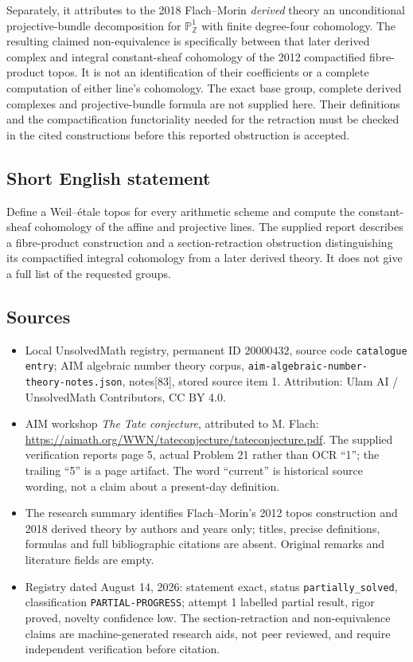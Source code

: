 \documentclass[11pt]{article}
\newcommand{\Z}{\mathbb{Z}}
\newcommand{\PP}{\mathbb{P}}
\begin{document}
Separately, it attributes to the 2018 Flach--Morin \emph{derived} theory an unconditional projective-bundle decomposition for \(\PP^1_{\Z}\) with finite degree-four cohomology. The resulting claimed non-equivalence is specifically between that later derived complex and integral constant-sheaf cohomology of the 2012 compactified fibre-product topos. It is not an identification of their coefficients or a complete computation of either line's cohomology. The exact base group, complete derived complexes and projective-bundle formula are not supplied here. Their definitions and the compactification functoriality needed for the retraction must be checked in the cited constructions before this reported obstruction is accepted.
\subsection{Short English statement}
Define a Weil--\'etale topos for every arithmetic scheme and compute the constant-sheaf cohomology of the affine and projective lines. The supplied report describes a fibre-product construction and a section-retraction obstruction distinguishing its compactified integral cohomology from a later derived theory. It does not give a full list of the requested groups.
\subsection{Sources}
\begin{itemize}
\item Local UnsolvedMath registry, permanent ID \(20000432\), source code \texttt{catalogue entry}; AIM algebraic number theory corpus, \texttt{aim-algebraic-number-theory-notes.json}, notes[83], stored source item 1. Attribution: Ulam AI / UnsolvedMath Contributors, CC BY 4.0.
\item AIM workshop \emph{The Tate conjecture}, attributed to M. Flach: \url{https://aimath.org/WWN/tateconjecture/tateconjecture.pdf}. The supplied verification reports page 5, actual Problem 21 rather than OCR ``1''; the trailing ``5'' is a page artifact. The word ``current'' is historical source wording, not a claim about a present-day definition.
\item The research summary identifies Flach--Morin's 2012 topos construction and 2018 derived theory by authors and years only; titles, precise definitions, formulas and full bibliographic citations are absent. Original remarks and literature fields are empty.
\item Registry dated August 14, 2026: statement exact, status \texttt{partially\_solved}, classification \texttt{PARTIAL-PROGRESS}; attempt 1 labelled partial result, rigor proved, novelty confidence low. The section-retraction and non-equivalence claims are machine-generated research aids, not peer reviewed, and require independent verification before citation.
\end{itemize}
\end{document}
